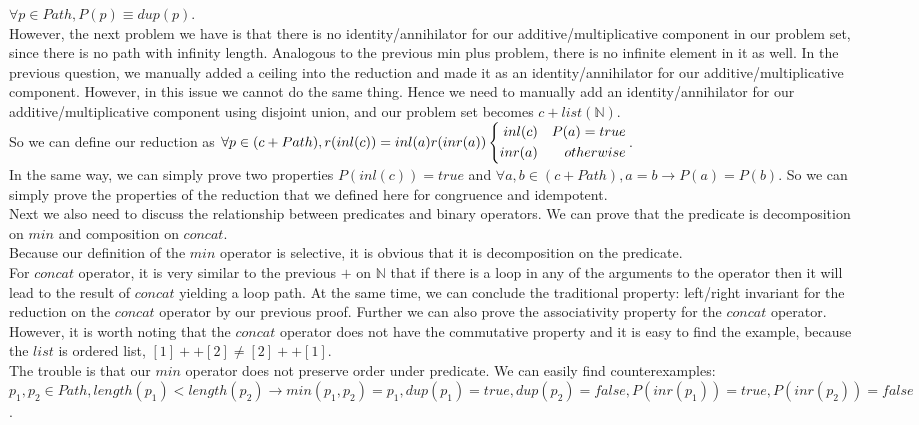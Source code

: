 \documentclass[a4paper,10pt]{article}
\begin{document}
$\forall p \in Path, P(p) \equiv dup(p)$.\\
However, the next problem we have is that there is no identity/annihilator for our additive/multiplicative component in our problem set, since there is no path with infinity length.
Analogous to the previous min plus problem, there is no infinite element in it as well. In the previous question, we manually added a ceiling into the reduction and made it as an identity/annihilator for our additive/multiplicative component. However, in this issue we cannot do the same thing. 
Hence we need to manually add an identity/annihilator for our additive/multiplicative component using disjoint union, and our problem set becomes $c + list(\mathbb{N})$.\\
So we can define our reduction as $\forall p \in (c + Path), r(inl(c)) = inl(a)\\
r(inr (a))
\left\{
\begin{aligned}
inl(c) &  & P(a) = true \\
inr(a) &  & otherwise 
\end{aligned}
\right.$.\\
In the same way, we can simply prove two properties $P(inl( c)) = true$ and $\forall a,b \in (c + Path), a = b \rightarrow P(a) = P(b)$. So we can simply prove the properties of the reduction that we defined here for congruence and idempotent.\\
Next we also need to discuss the relationship between predicates and binary operators. 
We can prove that the predicate is decomposition on $min$ and composition on $concat$. \\
Because our definition of the $min$ operator is selective, it is obvious that it is decomposition on the predicate. \\
For $concat$ operator, it is very similar to the previous $+$ on $\mathbb{N}$ that if there is a loop in any of the arguments to the operator then it will lead to the result of $concat$ yielding a loop path. At the same time, we can conclude the traditional property: left/right invariant for the reduction on the $concat$ operator by our previous proof. 
Further we can also prove the associativity property for the $concat$ operator. 
However, it is worth noting that the $concat$ operator does not have the commutative property and it is easy to find the example, because the $list$ is ordered list, $[1] ++ [2] \neq [2] ++ [1]$.\\
The trouble is that our $min$ operator does not preserve order under predicate. 
We can easily find counterexamples: $p_1,p_2 \in Path, length (p_1) < length(p_2) \rightarrow min(p_1,p_2) = p_1, dup(p_1) = true, dup(p_2) = false, P(inr(p_1)) = true, P(inr(p_2)) = false$. 
\end{document}
